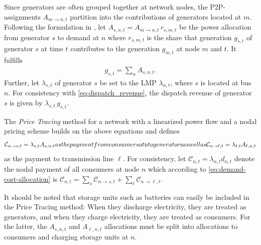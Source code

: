 \documentclass[11pt,twocolumn]{article}
\newcommand{\generation}{g_{s,t}}
\newcommand{\nodalgeneration}[1][n]{g_{#1,t}}
\newcommand{\lmp}[1][n]{\lambda_{#1,t}}
\newcommand{\demand}[1][n]{d_{#1,t}}
\newcommand{\cost}{\mathcal{C}}
\newcommand{\payment}[1][n]{\cost_{#1,t}}
\newcommand{\allocategeneration}[1][s, n]{A_{#1,t}}
\newcommand{\allocatepeer}[1][m \rightarrow n]{A_{#1,t}}
\newcommand{\allocateflow}[1][n]{A_{\ell,#1,t}}
\newcommand{\allocategeneratorcost}[1][n \rightarrow s]{\cost_{#1, t}}
\newcommand{\allocatelinecost}[1][n \rightarrow \ell]{\cost_{#1, t}}
\begin{document}
Since generators are often grouped together at network nodes, the \ac{P2P}-assignments $\allocatepeer$ partition into the contributions of generators located at $m$. Following the formulation in \cite{schafer_tracing_2020}, let $\allocategeneration = \allocatepeer \, r_{s,m,t}$ be the power allocation from generator $s$ to demand at $n$ where $r_{s,m,t}$ is the share that generation $\generation$ of generator $s$ at time $t$ contributes to the generation $\nodalgeneration[m]$ at node $m$ and $t$. It fulfills
\begin{align}
    \generation = \sum_n \allocategeneration .
    \label{eq:generation-breakdown}
\end{align}  
Further, let $\lmp[s]$ of generator $s$ be set to the \ac{LMP} $\lmp$, where $s$ is located at bus $n$. For consistency with \cref{eq:dispatch_revenue}, the dispatch revenue of generator $s$ is given by $\lmp[s] \, \generation$.\


The \textit{Price Tracing} method for a network with a linearized power flow and a nodal pricing scheme builds on the above equations and defines  
\begin{subequations}
    \begin{align}
    \allocategeneratorcost = \lmp[s] \allocategeneration
\end{align}
as the payment from consumers at $n$ to generator $s$ as well as  
\begin{align}
    \allocatelinecost = \lmp[\ell] \allocateflow
\end{align}
\end{subequations}
as the payment to transmission line $\ell$. For consistency, let $\payment = \lmp \demand$ denote the nodal payment of all consumers at node $n$ which according to \cref{eq:demand-cost-allocation} is $\payment = \sum_s \allocategeneratorcost + \sum_\ell \allocatelinecost$. 

It should be noted that storage units such as batteries can easily be included in the Price Tracing method: When they discharge electricity, they are treated as generators, and when they charge electricity, they are treated as consumers. For the latter, the $\allocategeneration$ and $\allocateflow$ allocations must be split into allocations to consumers and charging storage units at $n$.   

\end{document}
